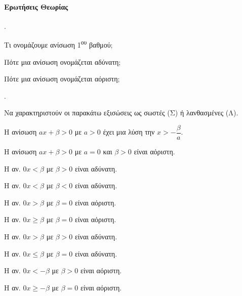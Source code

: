 \documentclass[11pt,a4paper,twocolumn]{article}
\newcounter{askhsh}
\newcommand{\askhsh}{{\large\theaskhsh.}\ \addtocounter{askhsh}{1}}
\begin{document}
\paragraph{Ερωτήσεις Θεωρίας}
\askhsh 
\begin{alist}
\item Τι ονομάζουμε ανίσωση 1\textsuperscript{ου} βαθμού;
\item Πότε μια ανίσωση ονομάζεται αδύνατη;
\item Πότε μια ανίσωση ονομάζεται αόριστη;
\end{alist}
\askhsh Να χαρακτηριστούν οι παρακάτω εξισώσεις ως σωστές (Σ) ή λανθασμένες (Λ).
\begin{alist}[label=\roman*.]
\item Η ανίσωση $ ax+\beta>0 $ με $ a>0 $ έχει μια λύση την $ x>-\dfrac{\beta}{a} $.
\item Η ανίσωση $ ax+\beta>0 $ με $ a=0 $ και $ \beta>0 $ είναι αόριστη.
\item Η αν. $ 0x<\beta $ με $ \beta>0 $ είναι αδύνατη.
\item Η αν. $ 0x<\beta $ με $ \beta<0 $ είναι αδύνατη.
\item Η αν. $ 0x>\beta $ με $ \beta=0 $ είναι αόριστη.
\item Η αν. $ 0x\geq\beta $ με $ \beta=0 $ είναι αόριστη.
\item Η αν. $ 0x>\beta $ με $ \beta>0 $ είναι αδύνατη.
\item Η αν. $ 0x\leq\beta $ με $ \beta=0 $ είναι αδύνατη.
\item Η αν. $ 0x<-\beta $ με $ \beta>0 $ είναι αόριστη.
\item Η αν. $ 0x\geq-\beta $ με $ \beta=0 $ είναι αόριστη.
\end{alist}
\end{document}
